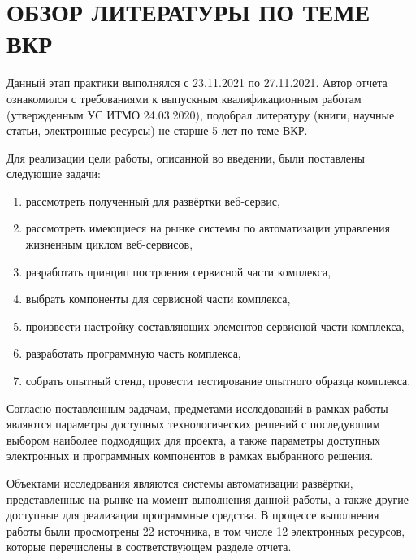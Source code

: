\section{ОБЗОР ЛИТЕРАТУРЫ ПО ТЕМЕ ВКР}

Данный этап практики выполнялся с 23.11.2021 по 27.11.2021.
Автор отчета ознакомился с требованиями к выпускным квалификационным работам (утвержденным УС ИТМО 24.03.2020), подобрал литературу (книги, научные статьи, электронные ресурсы) не старше 5 лет по теме ВКР.

Для реализации цели работы, описанной во введении, были поставлены следующие задачи:
\begin{enumerate}
    \item рассмотреть полученный для развёртки веб-сервис,
    \item рассмотреть имеющиеся на рынке системы по автоматизации управления жизненным циклом веб-сервисов,
    \item разработать принцип построения сервисной части комплекса,
    \item выбрать компоненты для сервисной части комплекса,
    \item произвести настройку составляющих элементов сервисной части комплекса,
    \item разработать программную часть комплекса,
    \item собрать опытный стенд, провести тестирование опытного образца комплекса.
\end{enumerate}

Согласно поставленным задачам, предметами исследований в рамках работы являются параметры доступных технологических
решений с последующим выбором наиболее подходящих для проекта, а также параметры доступных электронных и программных
компонентов в рамках выбранного решения.

Объектами исследования являются системы автоматизации развёртки, представленные на рынке на момент выполнения данной работы, а также другие доступные для реализации программные средства.
В процессе выполнения работы были просмотрены 22 источника, в том числе 12 электронных ресурсов, которые перечислены в соответствующем разделе отчета.
